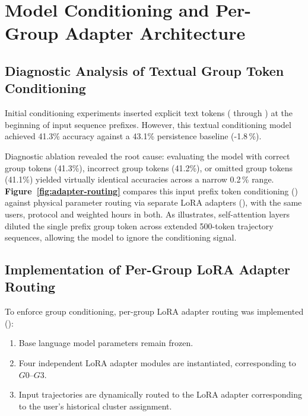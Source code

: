 

\section{Model Conditioning and Per-Group Adapter Architecture}

\subsection{Diagnostic Analysis of Textual Group Token Conditioning}

Initial conditioning experiments inserted explicit text tokens ( through ) at the beginning of input sequence prefixes. However, this textual conditioning model achieved 41.3\% accuracy against a 43.1\% persistence baseline (-1.8\,\%).

Diagnostic ablation revealed the root cause: evaluating the model with correct group tokens (41.3\%), incorrect group tokens (41.2\%), or omitted group tokens (41.1\%) yielded virtually identical accuracies across a narrow 0.2\,\% range. \textbf{Figure~\ref{fig:adapter-routing}} compares this input prefix token conditioning (\textbf{}) against physical parameter routing via separate LoRA adapters (\textbf{}), with the same users, protocol and weighted hours in both. As \textbf{} illustrates, self-attention layers diluted the single prefix group token across extended 500-token trajectory sequences, allowing the model to ignore the conditioning signal.



\subsection{Implementation of Per-Group LoRA Adapter Routing}

To enforce group conditioning, per-group LoRA adapter routing was implemented (\textbf{}):
\begin{enumerate}
  \item Base language model parameters remain frozen.
  \item Four independent LoRA adapter modules are instantiated, corresponding to $G0$--$G3$.
  \item Input trajectories are dynamically routed to the LoRA adapter corresponding to the user's historical cluster assignment.
\end{enumerate}

